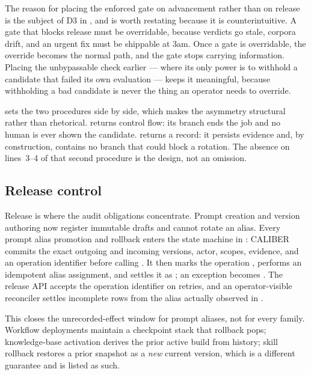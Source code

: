 The reason for placing the enforced gate on advancement rather than on release is
the subject of D3 in , and is worth restating because it is
counterintuitive. A gate that blocks release must be overridable, because verdicts
go stale, corpora drift, and an urgent fix must be shippable at 3am. Once a gate is
overridable, the override becomes the normal path, and the gate stops carrying
information. Placing the unbypassable check earlier --- where its only power is to
withhold a candidate that failed its own evaluation --- keeps it meaningful, because
withholding a bad candidate is never the thing an operator needs to override.

 sets the two procedures side by side, which makes the asymmetry
structural rather than rhetorical.  returns control flow: its
 branch ends the job and no human is ever shown the candidate.
 returns a record: it persists evidence and, by construction,
contains no branch that could block a rotation. The absence on lines~3--4 of that
second procedure is the design, not an omission.

\subsection{Release control}



Release is where the audit obligations concentrate. Prompt creation and version
authoring now register immutable drafts and cannot rotate an alias. Every prompt
alias promotion and rollback enters the state machine in :
CALIBER commits the exact outgoing and incoming versions, actor, scopes, evidence,
and an operation identifier before calling \mlflow{}. It then marks the operation
, performs an idempotent alias assignment, and settles it as
; an exception becomes . The release API
accepts the operation identifier on retries, and an operator-visible reconciler
settles incomplete rows from the alias actually observed in \mlflow{}.

This closes the unrecorded-effect window for prompt aliases, not for every family.
Workflow deployments maintain a checkpoint stack that rollback pops; knowledge-base
activation derives the prior active build from history; skill rollback restores a
prior snapshot as a \emph{new} current version, which is a different guarantee and
is listed as such.

